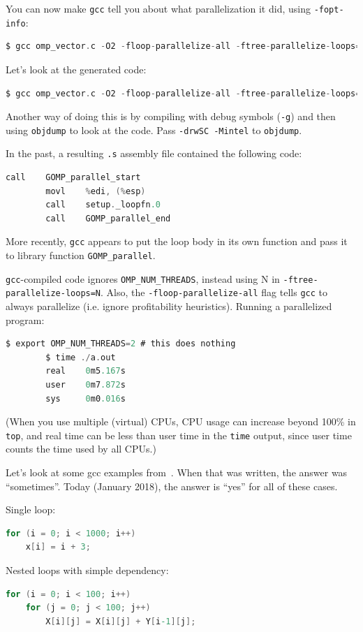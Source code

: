 \documentclass[a4paper]{report}
\begin{document}
You can now make {\tt gcc} tell you about what parallelization it did, using {\tt -fopt-info}:
\begin{lstlisting}[language=C]
$ gcc omp_vector.c -O2 -floop-parallelize-all -ftree-parallelize-loops=2 -fopt-info
\end{lstlisting}
Let's look at the generated code:
\begin{lstlisting}[language=C]
$ gcc omp_vector.c -O2 -floop-parallelize-all -ftree-parallelize-loops=2 -fopt-info -S
\end{lstlisting}
Another way of doing this is by compiling with debug symbols ({\tt -g}) and then using {\tt objdump}
to look at the code. Pass {\tt -drwSC -Mintel} to {\tt objdump}.

In the past, a resulting {\tt .s} assembly file contained the following code:

\begin{lstlisting}[language=C]
        call    GOMP_parallel_start
        movl    %edi, (%esp)
        call    setup._loopfn.0
        call    GOMP_parallel_end
\end{lstlisting}
More recently, {\tt gcc} appears to put the loop
body in its own function and pass it to library function {\tt GOMP\_parallel}.

{\tt gcc}-compiled code ignores \verb+OMP_NUM_THREADS+, instead using N in {\tt -ftree-parallelize-loops=N}. Also, the {\tt -floop-parallelize-all} flag tells {\tt gcc} to always parallelize (i.e. ignore profitability heuristics). Running a parallelized program:
\begin{lstlisting}[language=C]
        $ export OMP_NUM_THREADS=2 # this does nothing
        $ time ./a.out
        real    0m5.167s
        user    0m7.872s
        sys     0m0.016s
\end{lstlisting}

(When you use multiple (virtual) CPUs, CPU usage can increase beyond
100\% in {\tt top}, and real time can be less than user time in
the {\tt time} output, since user time counts the time used by all CPUs.)

Let's look at some gcc examples from~\cite{autopar:related}. When that was written, the answer was ``sometimes''.
Today (January 2018), the answer is ``yes'' for all of these cases.

  Single loop:
  \begin{lstlisting}[language=C]
for (i = 0; i < 1000; i++)
    x[i] = i + 3;
  \end{lstlisting}

  Nested loops with simple dependency:
  \begin{lstlisting}[language=C]
for (i = 0; i < 100; i++)
    for (j = 0; j < 100; j++)
        X[i][j] = X[i][j] + Y[i-1][j];
  \end{lstlisting}
\end{document}
